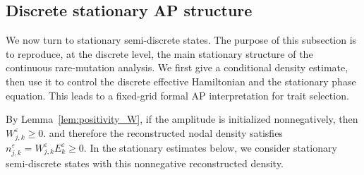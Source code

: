 \documentclass[11pt, dina4, amsfont12]{article}
\newtheorem{remark}{Remark}[section]
\begin{document}



\subsection{Discrete stationary AP structure}
\label{subsec:stationary_discrete_AP}

We now turn to stationary semi-discrete states. The purpose of this subsection
is to reproduce, at the discrete level, the main stationary structure of the
continuous rare-mutation analysis. We first give a conditional density
estimate, then use it to control the discrete effective Hamiltonian and the
stationary phase equation. This leads to a fixed-grid formal AP
interpretation for trait selection. 

By Lemma~\ref{lem:positivity_W}, if the amplitude is initialized
nonnegatively, then
$
    W_{j,k}^\varepsilon\ge0.
$
and therefore the reconstructed nodal density satisfies
$
    n_{j,k}^\varepsilon
    =
    W_{j,k}^\varepsilon E_k^\varepsilon
    \ge0.
$
In the stationary estimates below, we consider stationary semi-discrete
states with this nonnegative reconstructed density.
\end{document}
